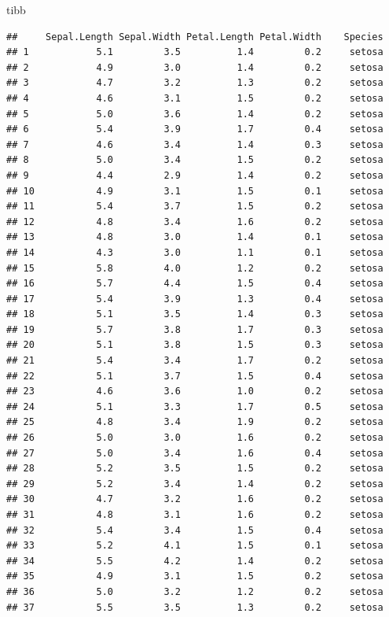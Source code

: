 \documentclass[ignorenonframetext,]{beamer}
\begin{document}
\begin{frame}[fragile]{tibb}
\begin{verbatim}
##     Sepal.Length Sepal.Width Petal.Length Petal.Width    Species
## 1            5.1         3.5          1.4         0.2     setosa
## 2            4.9         3.0          1.4         0.2     setosa
## 3            4.7         3.2          1.3         0.2     setosa
## 4            4.6         3.1          1.5         0.2     setosa
## 5            5.0         3.6          1.4         0.2     setosa
## 6            5.4         3.9          1.7         0.4     setosa
## 7            4.6         3.4          1.4         0.3     setosa
## 8            5.0         3.4          1.5         0.2     setosa
## 9            4.4         2.9          1.4         0.2     setosa
## 10           4.9         3.1          1.5         0.1     setosa
## 11           5.4         3.7          1.5         0.2     setosa
## 12           4.8         3.4          1.6         0.2     setosa
## 13           4.8         3.0          1.4         0.1     setosa
## 14           4.3         3.0          1.1         0.1     setosa
## 15           5.8         4.0          1.2         0.2     setosa
## 16           5.7         4.4          1.5         0.4     setosa
## 17           5.4         3.9          1.3         0.4     setosa
## 18           5.1         3.5          1.4         0.3     setosa
## 19           5.7         3.8          1.7         0.3     setosa
## 20           5.1         3.8          1.5         0.3     setosa
## 21           5.4         3.4          1.7         0.2     setosa
## 22           5.1         3.7          1.5         0.4     setosa
## 23           4.6         3.6          1.0         0.2     setosa
## 24           5.1         3.3          1.7         0.5     setosa
## 25           4.8         3.4          1.9         0.2     setosa
## 26           5.0         3.0          1.6         0.2     setosa
## 27           5.0         3.4          1.6         0.4     setosa
## 28           5.2         3.5          1.5         0.2     setosa
## 29           5.2         3.4          1.4         0.2     setosa
## 30           4.7         3.2          1.6         0.2     setosa
## 31           4.8         3.1          1.6         0.2     setosa
## 32           5.4         3.4          1.5         0.4     setosa
## 33           5.2         4.1          1.5         0.1     setosa
## 34           5.5         4.2          1.4         0.2     setosa
## 35           4.9         3.1          1.5         0.2     setosa
## 36           5.0         3.2          1.2         0.2     setosa
## 37           5.5         3.5          1.3         0.2     setosa

\end{verbatim}
\end{frame}
\end{document}
